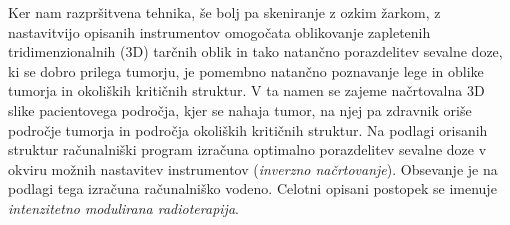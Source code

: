 \documentclass[a4paper,twoside,11pt]{article}
\begin{document}
	\par{
	  Ker nam razpršitvena tehnika, še bolj pa skeniranje z ozkim žarkom, z nastavitvijo opisanih instrumentov omogočata oblikovanje zapletenih tridimenzionalnih (3D) tarčnih oblik in tako natančno porazdelitev sevalne doze, ki se dobro prilega tumorju, je pomembno natančno poznavanje lege in oblike tumorja in okoliških kritičnih struktur. V ta namen se zajeme načrtovalna 3D slike pacientovega področja, kjer se nahaja tumor, na njej pa zdravnik oriše področje tumorja in področja okoliških kritičnih struktur. Na podlagi orisanih struktur računalniški program izračuna optimalno porazdelitev sevalne doze v okviru možnih nastavitev instrumentov (\emph{inverzno načrtovanje}). Obsevanje je na podlagi tega izračuna računalniško vodeno. Celotni opisani postopek se imenuje \emph{intenzitetno modulirana radioterapija}. \cite{jaffray2012}
	}
\end{document}
